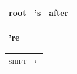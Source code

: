 \documentclass[t]{beamer}
\begin{document}
\begin{frame}
{\begin{varwidth}{2.3\linewidth}
{\begin{dependency}
    \end{dependency}
	\\
	\begin{tabular}{|l|l|l|}\hline
	\color{red} root & \color{red} 's & \color{red} after \\ \hline
	\end{tabular}
	\hspace{37mm}
	\begin{tabular}{|l|}\hline
	\color{blue} 're \\ \hline
	\end{tabular}
	}
	\begin{tabular}{c}\textsc{shift}$\rightarrow$\end{tabular}
	
    \vspace{5mm}
    

\end{varwidth}}
\end{frame}
\end{document}
